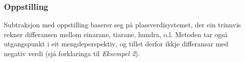 \subsubsection{Oppstilling}
Subtraksjon med oppstilling baserer seg på plassverdisystemet, der ein trinnvis rekner differansen mellom einarane, tiarane, hundra, o.l. Metoden tar også utgangspunkt i eit mengdeperspektiv, og tillet derfor ikkje differansar med negativ verdi (sjå forklaringa til \textsl{Eksempel 2}).
\begin{center}
	\parbox{0.3\linewidth}{
} \qquad
\parbox{0.3\linewidth}{
} \\[12pt]
\parbox{0.3\linewidth}{
}\qquad
\parbox{0.3\linewidth}{
}

\end{center}
